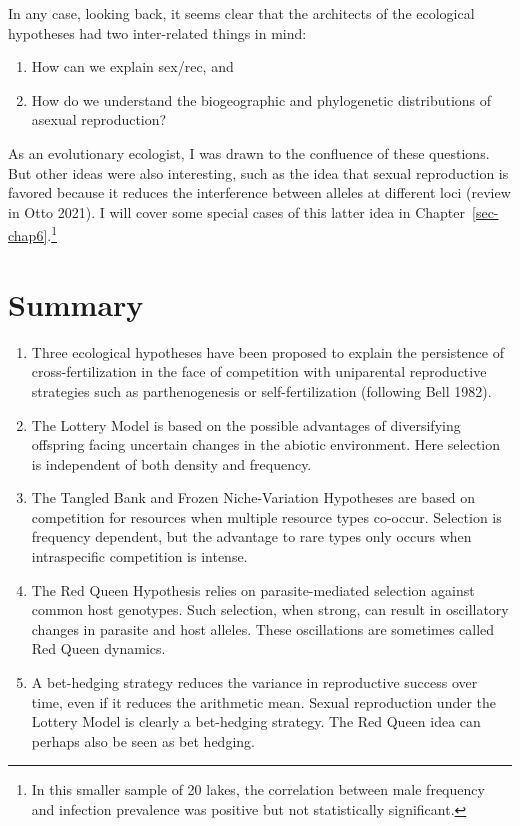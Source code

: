 \documentclass[
  letterpaper,
]{book}
\providecommand{\tightlist}{%
  \setlength{\itemsep}{0pt}\setlength{\parskip}{0pt}}\usepackage{longtable,booktabs,array}
\begin{document}
In any case, looking back, it seems clear that the architects of the
ecological hypotheses had two inter-related things in mind:

\begin{enumerate}
\def\labelenumi{\arabic{enumi}.}
\tightlist
\item
  How can we explain sex/rec, and
\item
  How do we understand the biogeographic and phylogenetic distributions
  of asexual reproduction?
\end{enumerate}

As an evolutionary ecologist, I was drawn to the confluence of these
questions. But other ideas were also interesting, such as the idea that
sexual reproduction is favored because it reduces the interference
between alleles at different loci (review in Otto 2021). I will cover
some special cases of this latter idea in
Chapter~\ref{sec-chap6}.\footnote{In this smaller sample of 20 lakes,
  the correlation between male frequency and infection prevalence was
  positive but not statistically significant.}

\hypertarget{summary-1}{%
\section{Summary}\label{summary-1}}

\begin{enumerate}
\def\labelenumi{\arabic{enumi}.}
\item
  Three ecological hypotheses have been proposed to explain the
  persistence of cross-fertilization in the face of competition with
  uniparental reproductive strategies such as parthenogenesis or
  self-fertilization (following Bell 1982).
\item
  The Lottery Model is based on the possible advantages of diversifying
  offspring facing uncertain changes in the abiotic environment. Here
  selection is independent of both density and frequency.
\item
  The Tangled Bank and Frozen Niche-Variation Hypotheses are based on
  competition for resources when multiple resource types co-occur.
  Selection is frequency dependent, but the advantage to rare types only
  occurs when intraspecific competition is intense.
\item
  The Red Queen Hypothesis relies on parasite-mediated selection against
  common host genotypes. Such selection, when strong, can result in
  oscillatory changes in parasite and host alleles. These oscillations
  are sometimes called Red Queen dynamics.
\item
  A bet-hedging strategy reduces the variance in reproductive success
  over time, even if it reduces the arithmetic mean. Sexual reproduction
  under the Lottery Model is clearly a bet-hedging strategy. The Red
  Queen idea can perhaps also be seen as bet hedging.
\end{enumerate}
\end{document}
